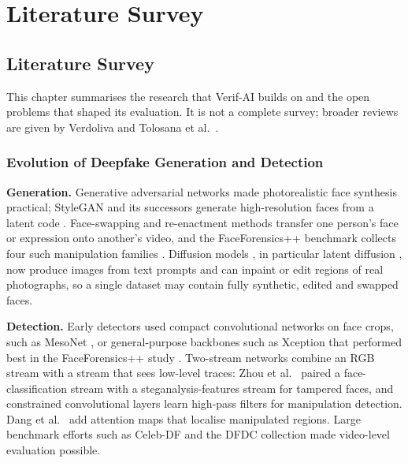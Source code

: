 \chapter{Literature Survey}
\label{ch:lit}

\section{Literature Survey}
This chapter summarises the research that Verif-AI builds on and the open problems that shaped its evaluation. It is not a complete survey;
broader reviews are given by Verdoliva \citep{verdoliva2020media} and Tolosana et al.\ \citep{tolosana2020deepfakes}.

\subsection{Evolution of Deepfake Generation and Detection}
\textbf{Generation.} Generative adversarial networks \citep{goodfellow2014gan} made photorealistic face synthesis practical;
StyleGAN and its successors generate high-resolution faces from a latent code \citep{karras2019stylegan,karras2020stylegan2}. Face-swapping
and re-enactment methods transfer one person's face or expression onto another's video, and the FaceForensics++ benchmark collects four
such manipulation families \citep{rossler2019ff}. Diffusion models \citep{ho2020ddpm}, in particular latent diffusion
\citep{rombach2022ldm}, now produce images from text prompts and can inpaint or edit regions of real photographs, so a single dataset
may contain fully synthetic, edited and swapped faces.

\textbf{Detection.} Early detectors used compact convolutional networks on face crops, such as MesoNet \citep{afchar2018mesonet}, or
general-purpose backbones such as Xception \citep{chollet2017xception} that performed best in the FaceForensics++ study
\citep{rossler2019ff}. Two-stream networks combine an RGB stream with a stream that sees low-level traces: Zhou et al.\
\citep{zhou2017twostream} paired a face-classification stream with a steganalysis-features stream for tampered faces, and constrained
convolutional layers \citep{bayar2016constrained} learn high-pass filters for manipulation detection. Dang et al.\ \citep{dang2020detection}
add attention maps that localise manipulated regions. Large benchmark efforts such as Celeb-DF \citep{li2020celebdf} and the DFDC
collection \citep{dolhansky2020dfdc} made video-level evaluation possible.

